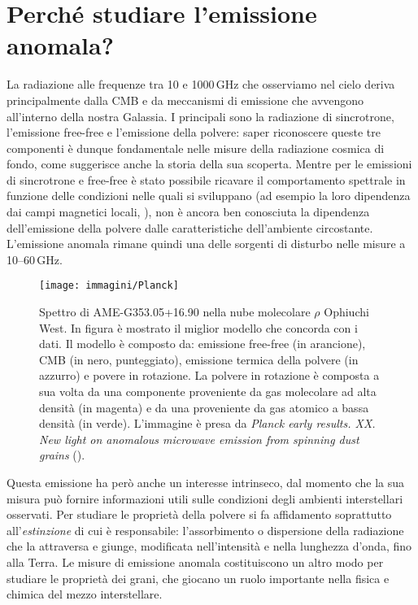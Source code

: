 \section{Perché studiare l'emissione anomala?}

La radiazione alle frequenze tra 10 e 1000\,GHz che osserviamo nel cielo deriva principalmente dalla CMB e da meccanismi di emissione che avvengono all'interno della nostra Galassia. I principali sono la radiazione di sincrotrone, l'emissione free-free e l'emissione della polvere: saper riconoscere queste tre componenti è dunque fondamentale nelle misure della radiazione cosmica di fondo, come suggerisce anche la storia della sua scoperta.
Mentre per le emissioni di sincrotrone e free-free è stato possibile ricavare il comportamento spettrale in funzione delle condizioni nelle quali si sviluppano (ad esempio la loro dipendenza dai campi magnetici locali, \cite{B92}), non è ancora ben conosciuta la dipendenza dell'emissione della polvere dalle caratteristiche dell'ambiente circostante. L'emissione anomala rimane quindi una delle sorgenti di disturbo nelle misure a 10--60\,GHz. 
\begin{figure}
\centering
\texttt{[image: immagini/Planck]}
\caption{Spettro di AME-G353.05+16.90 nella nube molecolare $\rho$ Ophiuchi West. In figura è mostrato il miglior modello che concorda con i dati. Il modello è composto da: emissione free-free (in arancione), CMB (in nero, punteggiato), emissione termica della polvere (in azzurro) e povere in rotazione. La polvere in rotazione è composta a sua volta da una componente proveniente da gas molecolare ad alta densità (in magenta) e da una proveniente da gas atomico a bassa densità (in verde). L'immagine è presa da \textit{Planck early results. XX. New light on anomalous microwave emission from spinning dust grains} (\cite{Planck}).}
\label{fig:Planck}
\end{figure}
Questa emissione ha però anche un interesse intrinseco, dal momento che la sua misura può fornire informazioni utili sulle condizioni degli ambienti interstellari osservati.
Per studiare le proprietà della polvere si fa affidamento soprattutto all'\textit{estinzione} di cui è responsabile: l'assorbimento o dispersione della radiazione che la attraversa e giunge, modificata nell'intensità e nella lunghezza d'onda, fino alla Terra. Le misure di emissione anomala costituiscono un altro modo per studiare le proprietà dei grani, che giocano un ruolo importante nella fisica e chimica del mezzo interstellare.
